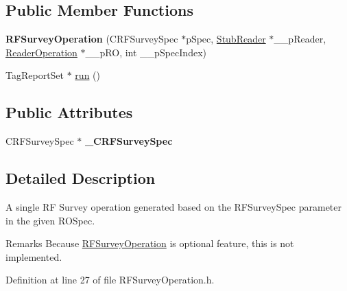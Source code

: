 \subsection*{Public Member Functions}
\begin{DoxyCompactItemize}
\item 
\hypertarget{class_e_l_f_i_n_1_1_r_f_survey_operation_a3c6e820d9f8ff75b35346217af43717b}{{\bfseries R\-F\-Survey\-Operation} (C\-R\-F\-Survey\-Spec $\ast$p\-Spec, \hyperlink{class_e_l_f_i_n_1_1_stub_reader}{Stub\-Reader} $\ast$\-\_\-\-\_\-p\-Reader, \hyperlink{class_e_l_f_i_n_1_1_reader_operation}{Reader\-Operation} $\ast$\-\_\-\-\_\-p\-R\-O, int \-\_\-\-\_\-p\-Spec\-Index)}\label{class_e_l_f_i_n_1_1_r_f_survey_operation_a3c6e820d9f8ff75b35346217af43717b}

\item 
Tag\-Report\-Set $\ast$ \hyperlink{class_e_l_f_i_n_1_1_r_f_survey_operation_a7eea340a95a2c04a7a93081354feeaf0}{run} ()
\end{DoxyCompactItemize}
\subsection*{Public Attributes}
\begin{DoxyCompactItemize}
\item 
\hypertarget{class_e_l_f_i_n_1_1_r_f_survey_operation_ab0ee396550a344b3c394598ebe2c0608}{C\-R\-F\-Survey\-Spec $\ast$ {\bfseries \-\_\-\-C\-R\-F\-Survey\-Spec}}\label{class_e_l_f_i_n_1_1_r_f_survey_operation_ab0ee396550a344b3c394598ebe2c0608}

\end{DoxyCompactItemize}


\subsection{Detailed Description}
A single R\-F Survey operation generated based on the R\-F\-Survey\-Spec parameter in the given R\-O\-Spec. 

\begin{DoxyRemark}{Remarks}
Because \hyperlink{class_e_l_f_i_n_1_1_r_f_survey_operation}{R\-F\-Survey\-Operation} is optional feature, this is not implemented. 
\end{DoxyRemark}


Definition at line 27 of file R\-F\-Survey\-Operation.\-h.



